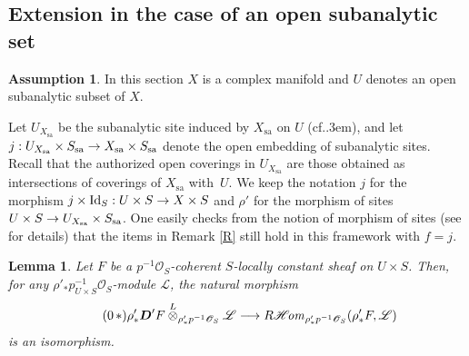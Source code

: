 \documentclass[english]{smfart}
\numberwithin{subsection}{section}
\let\oldtheequation\theequation
\def\numstareq{\let\oldtheequation\theequation\renewcommand{\theequation}{\oldtheequation$\,*$}}
\newenvironment{starequation}{\numstareq\begin{equation*}\tag{\theequation}}{\end{equation*}\let\theequation\oldtheequation\ignorespaces}
\def\shl{\mathcal{L}}
\def\sho{\mathcal{O}}\let\cO\sho
\newcommand{\bD}{\boldsymbol{D}}
\newcommand{\Rhom}{R\shhom}
\newcommand{\shhom}{\mathcal{H}\!\mathit{om}}\let\ho\shhom
\newcommand{\sa}{\mathrm{sa}}
\newcommand{\XS}{X\times S}
\def\cf{cf.\kern.3em}
\newcommand{\pOS}{p^{-1}\sho_S}
\numberwithin{equation}{section}
\theoremstyle{plain}
\newtheorem{lemma}[equation]{Lemma}
\theoremstyle{definition}
\newtheorem{assumption}[equation]{Assumption}
\def\to{\mathchoice{\longrightarrow}{\rightarrow}{\rightarrow}{\rightarrow}}
\begin{document}
\subsection{Extension in the case of an open subanalytic set}\label{subsec:Ext}
\begin{assumption} In this section $X$ is a complex manifold and $U$ denotes an open subanalytic subset of $X$.
\end{assumption}
Let $U_{X_\sa}$ be the subanalytic site induced by $X_\sa$ on $U$ (\cf \cite[Rem.\,1.1.1]{Prelli08}), and let $j:U_{X_\sa}\times S_\sa\to X_\sa\times S_\sa$ denote the open embedding of subanalytic sites. Recall that the authorized open coverings in $U_{X_{\sa}}$ are those obtained as intersections of coverings of $X_{\sa}$ with~$U$. We keep the notation $j$ for the morphism $j\times \Id_S: U\times S\to \XS$ and $\rho'$ for the morphism of sites $U\times S\to U_{X_{\sa}}\times S_{\sa}$. One easily checks from the notion of morphism of sites (see \cite[Chap.\,16]{K-Sch06} for details) that the items in Remark \ref{R} still hold in this framework with $f=j$.

\begin{lemma}\label{L:Groth}
Let $F$ be a $\pOS$-coherent $S$-locally constant sheaf on $U\times S$. Then, for any $\rho'_*p^{-1}_{U\times S}\sho_S$-module $\shl$, the natural morphism
\begin{starequation}\label{EGroth}
\rho'_*\bD'F\overset{L}{\otimes}_{\rho'_*\pOS}\shl \to\Rhom_{\rho'_*\pOS}(\rho'_*F,\shl)
\end{starequation}%
is an isomorphism.
\end{lemma}
\end{document}
